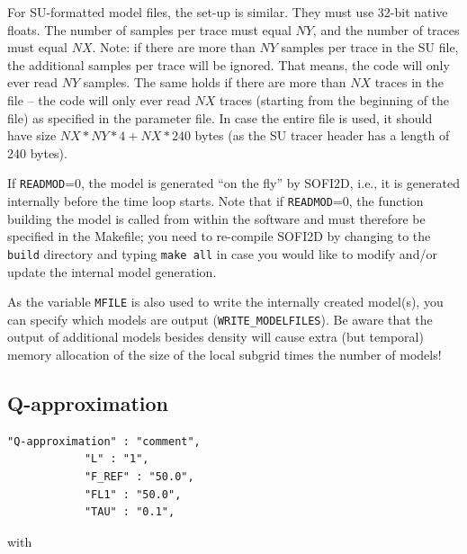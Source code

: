 For SU-formatted model files, the set-up is similar. They must use 32-bit native floats. The number of samples per trace must equal $NY$, and the number of traces must equal $NX$. Note: if there are more than $NY$ samples per trace in the SU file, the additional samples per trace will be ignored. That means, the code will only ever read $NY$ samples. The same holds if there are more than $NX$ traces in the file -- the code will only ever read $NX$ traces (starting from the beginning of the file) as specified in the parameter file. In case the entire file is used, it should have size $NX*NY*4+NX*240$ bytes (as the SU tracer header has a length of 240 bytes).

If \texttt{READMOD}=0, the model is generated \enquote{on the fly} by SOFI2D, i.e., it is generated internally before the time loop starts. Note that if \texttt{READMOD}=0, the function building the model is called from within the software and must therefore be specified in the Makefile; you need to re-compile SOFI2D by changing to the \texttt{build} directory and typing \texttt{make all} in case you would like to modify and/or update the internal model generation.

As the variable \texttt{MFILE} is also used to write the internally created model(s), you can specify which models are output (\texttt{WRITE\_MODELFILES}). Be aware that the output of additional models besides density will cause extra (but temporal) memory allocation of the size of the local subgrid times the number of models! 
    
\subsection{Q-approximation}
\label{Q-approximation}
\begin{verbatim}
"Q-approximation" : "comment",
            "L" : "1",
            "F_REF" : "50.0",
            "FL1" : "50.0", 
            "TAU" : "0.1",
\end{verbatim}

with 


